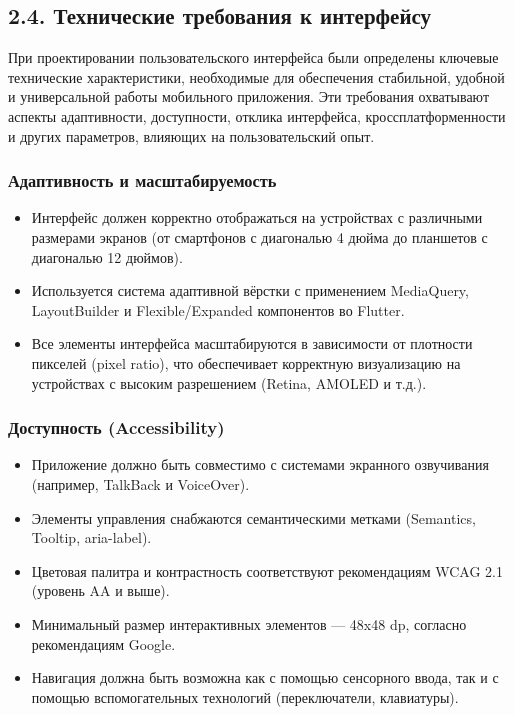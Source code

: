 \subsection*{2.4. Технические требования к интерфейсу}
При проектировании пользовательского интерфейса были определены ключевые технические характеристики, необходимые для обеспечения стабильной, удобной и универсальной работы мобильного приложения. Эти требования охватывают аспекты адаптивности, доступности, отклика интерфейса, кроссплатформенности и других параметров, влияющих на пользовательский опыт.

\subsubsection*{Адаптивность и масштабируемость}
\begin{itemize}
    \item Интерфейс должен корректно отображаться на устройствах с различными размерами экранов (от смартфонов с диагональю 4 дюйма до планшетов с диагональю 12 дюймов).
    \item Используется система адаптивной вёрстки с применением MediaQuery, LayoutBuilder и Flexible/Expanded компонентов во Flutter.
    \item Все элементы интерфейса масштабируются в зависимости от плотности пикселей (pixel ratio), что обеспечивает корректную визуализацию на устройствах с высоким разрешением (Retina, AMOLED и т.д.).
\end{itemize}

\subsubsection*{Доступность (Accessibility)}
\begin{itemize}
    \item Приложение должно быть совместимо с системами экранного озвучивания (например, TalkBack и VoiceOver).
    \item Элементы управления снабжаются семантическими метками (Semantics, Tooltip, aria-label).
    \item Цветовая палитра и контрастность соответствуют рекомендациям WCAG 2.1 (уровень AA и выше).
    \item Минимальный размер интерактивных элементов — 48x48 dp, согласно рекомендациям Google.
    \item Навигация должна быть возможна как с помощью сенсорного ввода, так и с помощью вспомогательных технологий (переключатели, клавиатуры).
\end{itemize}

